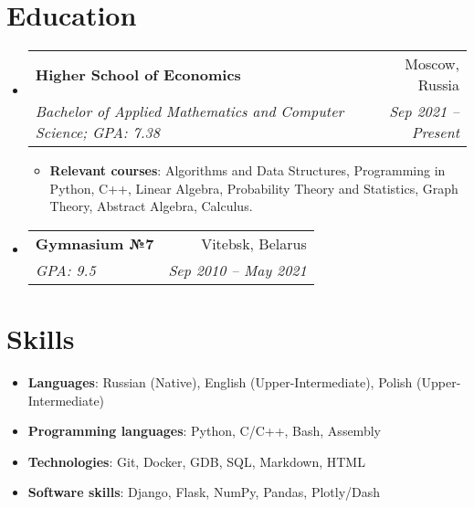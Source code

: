 \documentclass{resume}
\makeatletter
\newcommand{\resumeItem}[2]{
  \item\small{
    \textbf{#1}{: #2 \vspace{-2pt}}
  }
}
\newcommand{\resumeSubheading}[4]{
  \vspace{-1pt}\item
    \begin{tabular*}{0.97\textwidth}[t]{l@{\extracolsep{\fill}}r}
      \textbf{#1} & #2 \\
      \textit{\small#3} & \textit{\small #4} \\
    \end{tabular*}\vspace{-5pt}
}
\newcommand{\resumeSubHeadingListStart}{\begin{itemize}[leftmargin=*]}
\newcommand{\resumeSubHeadingListEnd}{\end{itemize}}
\newcommand{\resumeItemListStart}{\begin{itemize}}
\newcommand{\resumeItemListEnd}{\end{itemize}\vspace{-5pt}}
\makeatother
\begin{document}
\section{Education}
  \resumeSubHeadingListStart
    \resumeSubheading
      {Higher School of Economics}{Moscow, Russia}
      {Bachelor of Applied Mathematics and Computer Science;  GPA: 7.38}{Sep 2021 -- Present}
      \resumeItemListStart
      \medskip
      \resumeItem{Relevant courses} {Algorithms and Data Structures, Programming in Python, C++, Linear Algebra, Probability Theory and Statistics, Graph Theory, Abstract Algebra, Calculus.}
      \resumeItemListEnd
      \bigskip
      
      \resumeSubheading
        {Gymnasium №7}{Vitebsk, Belarus}{GPA: 9.5}{Sep 2010 -- May 2021}
  \resumeSubHeadingListEnd

\section{Skills}
 \resumeSubHeadingListStart
    \item{
    \textbf{Languages}{: Russian (Native), English (Upper-Intermediate), Polish (Upper-Intermediate)}
    }
    \smallskip
   \item{
     \textbf{Programming languages}{: Python, C/C++, Bash, Assembly}
   }
   \smallskip
   \item{\textbf{Technologies}{: Git, Docker, GDB, SQL, Markdown, HTML}}
   \smallskip
   \item{\textbf{Software skills}{: Django, Flask, NumPy, Pandas, Plotly/Dash}}
 \resumeSubHeadingListEnd
\end{document}
